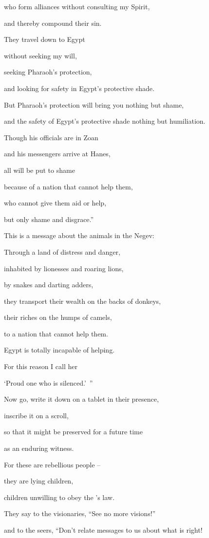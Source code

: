 {\par }{\Q who form
alliances
without
consulting my Spirit,
\par }{\Q and thereby
compound
their sin.
\par }{\Q {}They travel
down
to Egypt
\par }{\Q without
seeking
my will,
\par }{\Q seeking
Pharaoh’s
protection,
\par }{\Q and looking for safety
in Egypt’s
protective shade.
\par }{\Q {}But Pharaoh’s
protection
will bring you nothing but shame,
\par }{\Q and the safety of Egypt’s
protective
shade
nothing but humiliation.
\par }{\Q {}Though
his officials
are in Zoan
\par }{\Q and his messengers
arrive at Hanes,
\par }{\Q {}all
will be put to shame
\par }{\Q because of a nation
that cannot
help
them,
\par }{\Q who cannot
give
them aid
or
help,
\par }{\Q but
only shame
and disgrace.”
\par }{\Q {}This is a message
about the animals
in the Negev:
\par }{\Q Through a land
of distress
and danger,
\par }{\Q inhabited by lionesses
and roaring lions,
\par }{\Q by snakes
and darting
adders,
\par }{\Q they
transport
their wealth
on
the backs
of donkeys,
\par }{\Q their riches
on
the humps
of camels,
\par }{\Q to a nation
that cannot
help them.
\par }{\Q {}Egypt
is totally incapable of helping.
\par }{\Q For this
reason
I call
her
\par }{\Q ‘Proud
one who is silenced.’ ”
\par }{\Q {}Now
go,
write
it down on
a tablet
in their presence,

\par }{\Q inscribe
it on
a scroll,
\par }{\Q so that it might be preserved
for a future time
\par }{\Q as an enduring
witness.
\par }{\Q {}For
these
are rebellious
people
–
\par }{\Q they are lying
children,
\par }{\Q children
unwilling
to obey
the
{}’s
law.
\par }{\Q {}They say
to the visionaries,
“See
no
more visions!”
\par }{\Q and to the seers,
“Don’t
relate
messages
to us about what is right!

}
